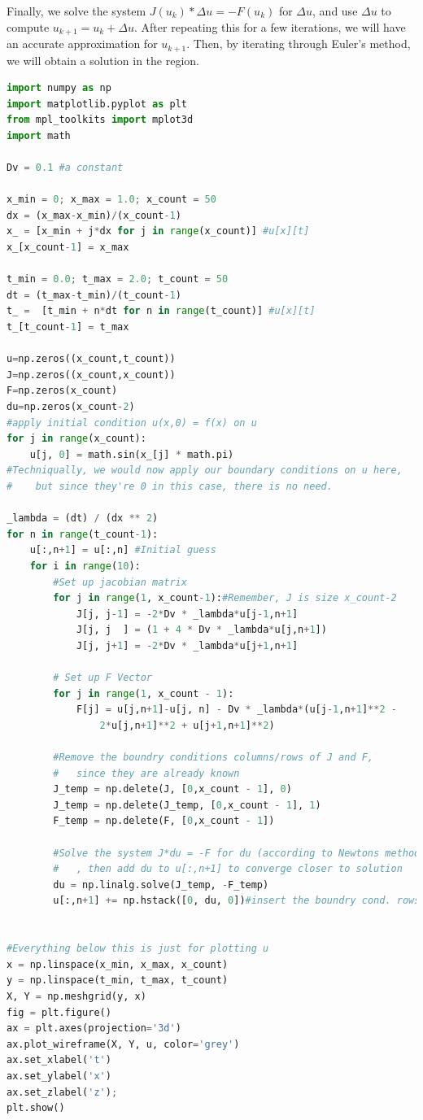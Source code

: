 \documentclass[11pt]{article}
\begin{document}
Finally, we solve the system $J(u_{k})*\Delta u = -F(u_{k})$ for $\Delta u$, and use $\Delta u$ to compute $u_{k+1} = u_{k} + \Delta u$. After repeating this for a few iterations, we will have an accurate approximation for $u_{k+1}$. Then, by iterating through Euler's method, we will obtain a solution in the region.
\begin{lstlisting}[language=Python]
import numpy as np
import matplotlib.pyplot as plt
from mpl_toolkits import mplot3d
import math

Dv = 0.1 #a constant

x_min = 0; x_max = 1.0; x_count = 50
dx = (x_max-x_min)/(x_count-1)
x_ = [x_min + j*dx for j in range(x_count)] #u[x][t]
x_[x_count-1] = x_max

t_min = 0.0; t_max = 2.0; t_count = 50
dt = (t_max-t_min)/(t_count-1)
t_ =  [t_min + n*dt for n in range(t_count)] #u[x][t]
t_[t_count-1] = t_max

u=np.zeros((x_count,t_count))
J=np.zeros((x_count,x_count))
F=np.zeros(x_count)
du=np.zeros(x_count-2)
#apply initial condition u(x,0) = f(x) on u
for j in range(x_count):
    u[j, 0] = math.sin(x_[j] * math.pi)
#Techniqually, we would now apply our boundary conditions on u here,
#    but since they're 0 in this case, there is no need.

_lambda = (dt) / (dx ** 2)
for n in range(t_count-1):
    u[:,n+1] = u[:,n] #Initial guess
    for i in range(10):
        #Set up jacobian matrix
        for j in range(1, x_count-1):#Remember, J is size x_count-2
            J[j, j-1] = -2*Dv * _lambda*u[j-1,n+1]
            J[j, j  ] = (1 + 4 * Dv * _lambda*u[j,n+1])
            J[j, j+1] = -2*Dv * _lambda*u[j+1,n+1]

        # Set up F Vector
        for j in range(1, x_count - 1):
            F[j] = u[j,n+1]-u[j, n] - Dv * _lambda*(u[j-1,n+1]**2 -
                2*u[j,n+1]**2 + u[j+1,n+1]**2)

        #Remove the boundry conditions columns/rows of J and F,
        #   since they are already known
        J_temp = np.delete(J, [0,x_count - 1], 0)
        J_temp = np.delete(J_temp, [0,x_count - 1], 1)
        F_temp = np.delete(F, [0,x_count - 1])

        #Solve the system J*du = -F for du (according to Newtons method)
        #   , then add du to u[:,n+1] to converge closer to solution
        du = np.linalg.solve(J_temp, -F_temp)
        u[:,n+1] += np.hstack([0, du, 0])#insert the boundry cond. rows 


#Everything below this is just for plotting u
x = np.linspace(x_min, x_max, x_count)
y = np.linspace(t_min, t_max, t_count)
X, Y = np.meshgrid(y, x)
fig = plt.figure()
ax = plt.axes(projection='3d')
ax.plot_wireframe(X, Y, u, color='grey')
ax.set_xlabel('t')
ax.set_ylabel('x')
ax.set_zlabel('z');
plt.show()
\end{lstlisting}
\end{document}
